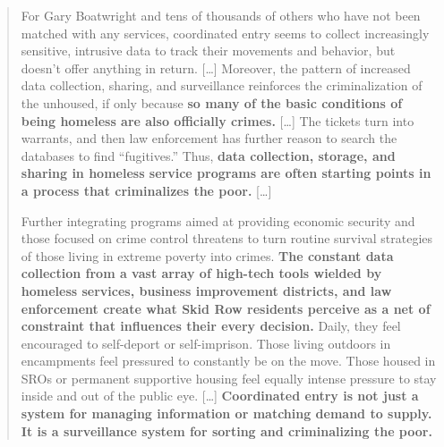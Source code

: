 \begin{quote}
For Gary Boatwright and tens of thousands of others who have not been
matched with any services, coordinated entry seems to collect
increasingly sensitive, intrusive data to track their movements and
behavior, but doesn't offer anything in return. {[}\ldots{]} Moreover,
the pattern of increased data collection, sharing, and surveillance
reinforces the criminalization of the unhoused, if only because
\textbf{so many of the basic conditions of being homeless are also
officially crimes.} {[}\ldots{]} The tickets turn into warrants, and
then law enforcement has further reason to search the databases to find
``fugitives.'' Thus, \textbf{data collection, storage, and sharing in
homeless service programs are often starting points in a process that
criminalizes the poor.} {[}\ldots{]}

Further integrating programs aimed at providing economic security and
those focused on crime control threatens to turn routine survival
strategies of those living in extreme poverty into crimes. \textbf{The
constant data collection from a vast array of high-tech tools wielded by
homeless services, business improvement districts, and law enforcement
create what Skid Row residents perceive as a net of constraint that
influences their every decision.} Daily, they feel encouraged to
self-deport or self-imprison. Those living outdoors in encampments feel
pressured to constantly be on the move. Those housed in SROs or
permanent supportive housing feel equally intense pressure to stay
inside and out of the public eye. {[}\ldots{]} \textbf{Coordinated entry
is not just a system for managing information or matching demand to
supply. It is a surveillance system for sorting and criminalizing the
poor.} \cite{eubanksAutomatingInequalityHow2019} 
\end{quote}

